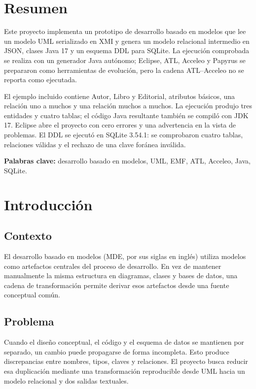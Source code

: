 \documentclass[12pt,a4paper,oneside]{report}
\begin{document}
\chapter*{Resumen}
Este proyecto implementa un prototipo de desarrollo basado en modelos que lee un modelo UML serializado en XMI y genera un modelo relacional intermedio en JSON, clases Java 17 y un esquema DDL para SQLite. La ejecución comprobada se realiza con un generador Java autónomo; Eclipse, ATL, Acceleo y Papyrus se prepararon como herramientas de evolución, pero la cadena ATL--Acceleo no se reporta como ejecutada.

El ejemplo incluido contiene Autor, Libro y Editorial, atributos básicos, una relación uno a muchos y una relación muchos a muchos. La ejecución produjo tres entidades y cuatro tablas; el código Java resultante también se compiló con JDK 17. Eclipse abre el proyecto con cero errores y una advertencia en la vista de problemas. El DDL se ejecutó en SQLite 3.54.1: se comprobaron cuatro tablas, relaciones válidas y el rechazo de una clave foránea inválida.

\noindent\textbf{Palabras clave:} desarrollo basado en modelos, UML, EMF, ATL, Acceleo, Java, SQLite.

\tableofcontents
\clearpage
\listoffigures
\clearpage
\listoftables
\clearpage
{}

\chapter{Introducción}
\section{Contexto}
El desarrollo basado en modelos (MDE, por sus siglas en inglés) utiliza modelos como artefactos centrales del proceso de desarrollo. En vez de mantener manualmente la misma estructura en diagramas, clases y bases de datos, una cadena de transformación permite derivar esos artefactos desde una fuente conceptual común.

\section{Problema}
Cuando el diseño conceptual, el código y el esquema de datos se mantienen por separado, un cambio puede propagarse de forma incompleta. Esto produce discrepancias entre nombres, tipos, claves y relaciones. El proyecto busca reducir esa duplicación mediante una transformación reproducible desde UML hacia un modelo relacional y dos salidas textuales.
\end{document}

